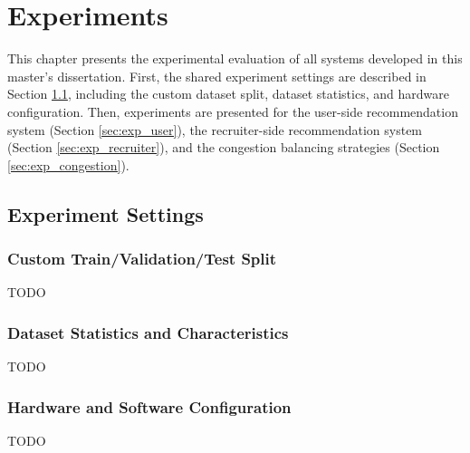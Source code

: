 \chapter{Experiments}
\label{chap:experiments}

This chapter presents the experimental evaluation of all systems developed in this master's dissertation. First, the shared experiment settings are described in Section \ref{sec:exp_settings}, including the custom dataset split, dataset statistics, and hardware configuration. Then, experiments are presented for the user-side recommendation system (Section \ref{sec:exp_user}), the recruiter-side recommendation system (Section \ref{sec:exp_recruiter}), and the congestion balancing strategies (Section \ref{sec:exp_congestion}).

\section{Experiment Settings}
\label{sec:exp_settings}

\subsection{Custom Train/Validation/Test Split}
\label{sec:custom_split}

TODO

\subsection{Dataset Statistics and Characteristics}
\label{sec:dataset_stats}

TODO

\subsection{Hardware and Software Configuration}
\label{sec:hardware}

TODO

